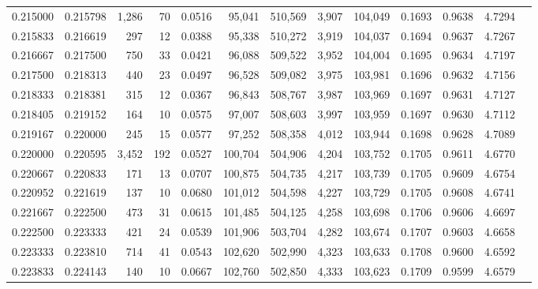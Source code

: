 \begin{tabular}{rrrrrrrrrrrrr}
0.215000 & 0.215798 & 1,286 &  70 &                                     0.0516 &  95,041 & 510,569 &   3,907 & 104,049 & 0.1693 & 0.9638 & 4.7294 \\
0.215833 & 0.216619 &   297 &  12 &                                     0.0388 &  95,338 & 510,272 &   3,919 & 104,037 & 0.1694 & 0.9637 & 4.7267 \\
0.216667 & 0.217500 &   750 &  33 &                                     0.0421 &  96,088 & 509,522 &   3,952 & 104,004 & 0.1695 & 0.9634 & 4.7197 \\
0.217500 & 0.218313 &   440 &  23 &                                     0.0497 &  96,528 & 509,082 &   3,975 & 103,981 & 0.1696 & 0.9632 & 4.7156 \\
0.218333 & 0.218381 &   315 &  12 &                                     0.0367 &  96,843 & 508,767 &   3,987 & 103,969 & 0.1697 & 0.9631 & 4.7127 \\
0.218405 & 0.219152 &   164 &  10 &                                     0.0575 &  97,007 & 508,603 &   3,997 & 103,959 & 0.1697 & 0.9630 & 4.7112 \\
0.219167 & 0.220000 &   245 &  15 &                                     0.0577 &  97,252 & 508,358 &   4,012 & 103,944 & 0.1698 & 0.9628 & 4.7089 \\
0.220000 & 0.220595 & 3,452 & 192 &                                     0.0527 & 100,704 & 504,906 &   4,204 & 103,752 & 0.1705 & 0.9611 & 4.6770 \\
0.220667 & 0.220833 &   171 &  13 &                                     0.0707 & 100,875 & 504,735 &   4,217 & 103,739 & 0.1705 & 0.9609 & 4.6754 \\
0.220952 & 0.221619 &   137 &  10 &                                     0.0680 & 101,012 & 504,598 &   4,227 & 103,729 & 0.1705 & 0.9608 & 4.6741 \\
0.221667 & 0.222500 &   473 &  31 &                                     0.0615 & 101,485 & 504,125 &   4,258 & 103,698 & 0.1706 & 0.9606 & 4.6697 \\
0.222500 & 0.223333 &   421 &  24 &                                     0.0539 & 101,906 & 503,704 &   4,282 & 103,674 & 0.1707 & 0.9603 & 4.6658 \\
0.223333 & 0.223810 &   714 &  41 &                                     0.0543 & 102,620 & 502,990 &   4,323 & 103,633 & 0.1708 & 0.9600 & 4.6592 \\
0.223833 & 0.224143 &   140 &  10 &                                     0.0667 & 102,760 & 502,850 &   4,333 & 103,623 & 0.1709 & 0.9599 & 4.6579 \\

\end{tabular}
